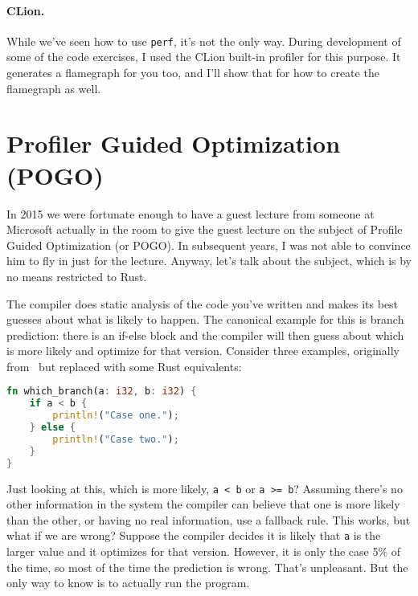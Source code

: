 \paragraph{CLion.} While we've seen how to use \texttt{perf}, it's not the only way. During development of some of the code exercises, I used the CLion built-in profiler for this purpose. It generates a flamegraph for you too, and I'll show that for how to create the flamegraph as well.

\section*{Profiler Guided Optimization (POGO)}

In 2015 we were fortunate enough to have a guest lecture from someone at Microsoft actually in the room to give the guest lecture on the subject of Profile Guided Optimization (or POGO). In subsequent years, I was not able to convince him to fly in just for the lecture. Anyway, let's talk about the subject, which is by no means restricted to Rust.

The compiler does static analysis of the code you've written and makes its best guesses about what is likely to happen. The canonical example for this is branch prediction: there is an if-else block and the compiler will then guess about which is more likely and optimize for that version. Consider three examples, originally from~\cite{pogo} but replaced with some Rust equivalents:

\begin{lstlisting}[language=Rust]
fn which_branch(a: i32, b: i32) {
    if a < b {
        println!("Case one.");
    } else {
        println!("Case two.");
    }
}
\end{lstlisting}

Just looking at this, which is more likely, \texttt{a < b} or \texttt{a >= b}? Assuming there's no other information in the system the compiler can believe that one is more likely than the other, or having no real information, use a fallback rule. This works, but what if we are wrong? Suppose the compiler decides it is likely that \texttt{a} is the larger value and it optimizes for that version. However, it is only the case 5\% of the time, so most of the time the prediction is wrong. That's unpleasant. But the only way to know is to actually run the program.

